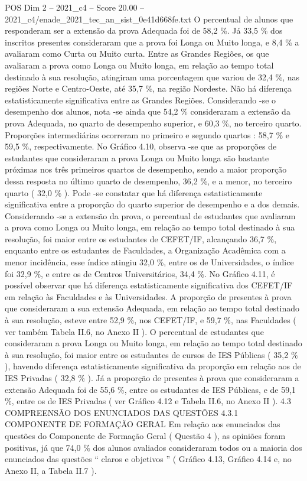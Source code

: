 \begin{textsample}{POS Dim 2 – 2021\_c4 – Score 20.00 – 2021\_c4/enade\_2021\_tec\_an\_sist\_0e41d668fe.txt}
O percentual de alunos que responderam ser a extensão da prova Adequada foi de 58,2 \%.
Já 33,5 \% dos inscritos presentes consideraram que a prova foi Longa ou Muito longa, e 8,4 \% a avaliaram como Curta ou Muito curta.
Entre as Grandes Regiões, os que avaliaram a prova como Longa ou Muito longa, em relação ao tempo total destinado à sua resolução, atingiram uma porcentagem que variou de 32,4 \%, nas regiões Norte e Centro-Oeste, até 35,7 \%, na região Nordeste.
Não há diferença estatisticamente significativa entre as Grandes Regiões.
Considerando -se o desempenho dos alunos, nota -se ainda que 54,2 \% consideraram a extensão da prova Adequada, no quarto de desempenho superior, e 60,3 \%, no terceiro quarto.
Proporções intermediárias ocorreram no primeiro e segundo quartos : 58,7 \% e 59,5 \%, respectivamente.
No Gráfico 4.10, observa -se que as proporções de estudantes que consideraram a prova Longa ou Muito longa são bastante próximas nos três primeiros quartos de desempenho, sendo a maior proporção dessa resposta no último quarto de desempenho, 36,2 \%, e a menor, no terceiro quarto ( 32,0 \% ).
Pode -se constatar que há diferença estatisticamente significativa entre a proporção do quarto superior de desempenho e a dos demais.
Considerando -se a extensão da prova, o percentual de estudantes que avaliaram a prova como Longa ou Muito longa, em relação ao tempo total destinado à sua resolução, foi maior entre os estudantes de CEFET/IF, alcançando 36,7 \%, enquanto entre os estudantes de Faculdades, a Organização Acadêmica com a menor incidência, esse índice atingiu 32,0 \%, entre os de Universidades, o índice foi 32,9 \%, e entre os de Centros Universitários, 34,4 \%.
No Gráfico 4.11, é possível observar que há diferença estatisticamente significativa dos CEFET/IF em relação às Faculdades e às Universidades.
A proporção de presentes à prova que consideraram a sua extensão Adequada, em relação ao tempo total destinado à sua resolução, esteve entre 52,9 \%, nos CEFET/IF, e 59,7 \%, nas Faculdades ( ver também Tabela II.6, no Anexo II ).
O percentual de estudantes que consideraram a prova Longa ou Muito longa, em relação ao tempo total destinado à sua resolução, foi maior entre os estudantes de cursos de IES Públicas ( 35,2 \% ), havendo diferença estatisticamente significativa da proporção em relação aos de IES Privadas ( 32,8 \% ).
Já a proporção de presentes à prova que consideraram a extensão Adequada foi de 55,6 \%, entre os estudantes de IES Públicas, e de 59,1 \%, entre os de IES Privadas ( ver Gráfico 4.12 e Tabela II.6, no Anexo II ). 4.3 COMPREENSÃO DOS ENUNCIADOS DAS QUESTÕES 4.3.1 COMPONENTE DE FORMAÇÃO GERAL Em relação aos enunciados das questões do Componente de Formação Geral ( Questão 4 ), as opiniões foram positivas, já que 74,0 \% dos alunos avaliados consideraram todos ou a maioria dos enunciados das questões “ claros e objetivos ” ( Gráfico 4.13, Gráfico 4.14 e, no Anexo II, a Tabela II.7 ).

\end{textsample}
